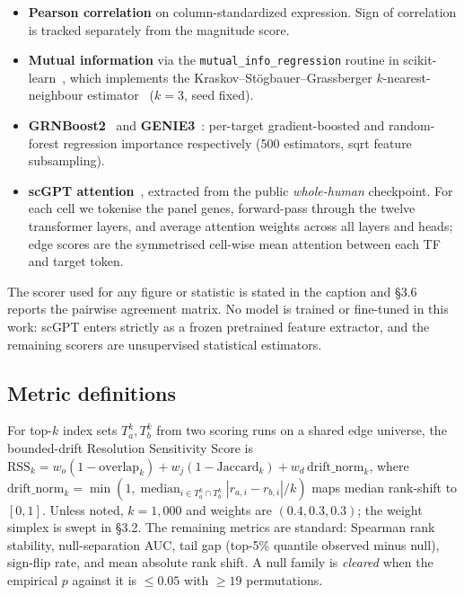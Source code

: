 \documentclass[unnumsec,webpdf,contemporary,large,namedate]{oup-authoring-template}
\begin{document}
\begin{itemize}
\item \textbf{Pearson correlation} on column-standardized expression.
      Sign of correlation is tracked separately from the magnitude score.
\item \textbf{Mutual information} via the \texttt{mutual\_info\_regression}
      routine in scikit-learn~\citep{Pedregosa2011}, which implements
      the Kraskov--St\"ogbauer--Grassberger $k$-nearest-neighbour
      estimator~\citep{Kraskov2004} ($k=3$, seed fixed).
\item \textbf{GRNBoost2}~\citep{Moerman2019} and
      \textbf{GENIE3}~\citep{Huynh-Thu2010}: per-target gradient-boosted
      and random-forest regression importance respectively (500
      estimators, sqrt feature subsampling).
\item \textbf{scGPT attention}~\citep{Cui2024}, extracted from the public
      \emph{whole-human} checkpoint. For each cell we tokenise the panel
      genes, forward-pass through the twelve transformer layers, and
      average attention weights across all layers and heads; edge scores
      are the symmetrised cell-wise mean attention between each TF and
      target token.
\end{itemize}

The scorer used for any figure or statistic is stated in the caption
and §3.6 reports the pairwise agreement matrix. No model is trained or
fine-tuned in this work: scGPT enters strictly as a frozen pretrained
feature extractor, and the remaining scorers are unsupervised
statistical estimators.

\subsection{Metric definitions}

For top-$k$ index sets $T_a^k, T_b^k$ from two scoring runs on a shared
edge universe, the bounded-drift Resolution Sensitivity Score is
$\text{RSS}_k = w_o(1 - \text{overlap}_k) + w_j(1 - \text{Jaccard}_k) + w_d\,\text{drift\_norm}_k$,
where $\text{drift\_norm}_k = \min(1, \operatorname{median}_{i \in T_a^k \cap T_b^k}|r_{a,i} - r_{b,i}|/k)$
maps median rank-shift to $[0, 1]$. Unless noted, $k = 1{,}000$ and
weights are $(0.4, 0.3, 0.3)$; the weight simplex is swept in §3.2.
The remaining metrics are standard: Spearman rank stability,
null-separation AUC, tail gap (top-5\% quantile observed minus null),
sign-flip rate, and mean absolute rank shift. A null family is
\emph{cleared} when the empirical $p$ against it is $\leq 0.05$
with $\geq 19$ permutations.
\end{document}
